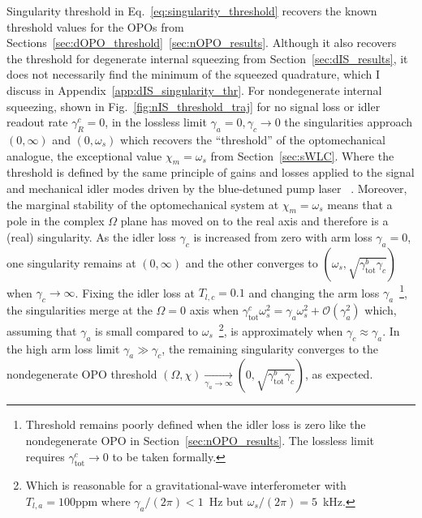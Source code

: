 Singularity threshold in Eq.~\ref{eq:singularity_threshold} recovers the known threshold values for the OPOs from Sections~\ref{sec:dOPO_threshold}~\ref{sec:nOPO_results}. Although it also recovers the threshold for degenerate internal squeezing from Section~\ref{sec:dIS_results}, it does not necessarily find the minimum of the squeezed quadrature, which I discuss in Appendix~\ref{app:dIS_singularity_thr}.
For nondegenerate internal squeezing, shown in Fig.~\ref{fig:nIS_threshold_traj} for no signal loss or idler readout rate $\gamma^c_R=0$, in the lossless limit $\gamma_a=0,\gamma_c\rightarrow0$ the singularities approach $(0,\infty)$ and $(0,\omega_s)$ which recovers the ``threshold'' of the optomechanical analogue, the exceptional value $\chi_m=\omega_s$ from Section~\ref{sec:sWLC}. Where the threshold is defined by the same principle of gains and losses applied to the signal and mechanical idler modes driven by the blue-detuned pump laser~\cite{} . Moreover, the marginal stability of the optomechanical system at $\chi_m=\omega_s$ means that a pole in the complex $\Omega$ plane has moved on to the real axis and therefore is a (real) singularity. As the idler loss $\gamma_c$ is increased from zero with arm loss $\gamma_a=0$, one singularity remains at $(0,\infty)$ and the other converges to $(\omega_s,\sqrt{\gamma^b_\text{tot}\gamma_c})$ when $\gamma_c\rightarrow\infty$. Fixing the idler loss at $T_{l,c}=0.1$ and changing the arm loss $\gamma_a$~\footnote{Threshold remains poorly defined when the idler loss is zero  like the nondegenerate OPO in Section~\ref{sec:nOPO_results}. The lossless limit requires $\gamma^c_\text{tot}\rightarrow0$ to be taken formally.}, the singularities merge  at the $\Omega=0$ axis when $\gamma^c_\text{tot}\omega_s^2=\gamma_a\omega_s^2+\mathcal{O}(\gamma_a^2)$ which, assuming that $\gamma_a$ is small compared to $\omega_s$~\footnote{Which is reasonable for a gravitational-wave interferometer with $T_{l,a}=100\text{ppm}$ where $\gamma_a/(2\pi)<1$~Hz but $\omega_s/(2\pi)=5$~kHz.}, is approximately  when $\gamma_c\approx\gamma_a$. In the high arm loss limit $\gamma_a\gg\gamma_c$, the remaining singularity converges to the nondegenerate OPO threshold $(\Omega,\chi)\xrightarrow[\gamma_a\rightarrow\infty]{}(0,\sqrt{\gamma^b_\mathrm{tot}\gamma_c})$, as expected.


